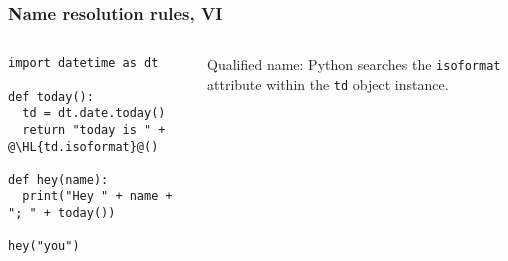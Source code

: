 \documentclass[english,serif,mathserif,xcolor=pdftex,dvipsnames,table]{beamer}
\begin{document}
\begin{frame}[fragile]
  \frametitle{Name resolution rules, VI}
  \begin{columns}
    \begin{column}[t]{0.6\linewidth}
\begin{lstlisting}
import datetime as dt

def today():
  td = dt.date.today()
  return "today is " + @\HL{td.isoformat}@()

def hey(name):
  print("Hey " + name + "; " + today())

hey("you")
\end{lstlisting}
    \end{column}
    \begin{column}[t]{0.4\linewidth}
      \raggedleft
      Qualified name: Python searches the \texttt{isoformat} attribute
      within the \texttt{td} object instance.
    \end{column}
  \end{columns}
\end{frame}






\end{document}
